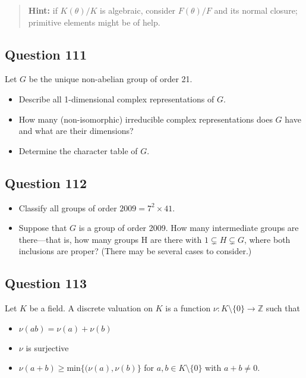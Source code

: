 \documentclass[12pt]{article}
\begin{document}
\begin{quote}
\textbf{Hint:} if \(K(\theta)/K\) is algebraic, consider \(F(\theta)/F\)
and its normal closure; primitive elements might be of help.
\end{quote}

\hypertarget{question-111}{%
\subsection{Question 111}\label{question-111}}

Let \(G\) be the unique non-abelian group of order 21.

\begin{itemize}
\item
  Describe all 1-dimensional complex representations of \(G\).
\item
  How many (non-isomorphic) irreducible complex representations does
  \(G\) have and what are their dimensions?
\item
  Determine the character table of \(G\).
\end{itemize}

\hypertarget{question-112}{%
\subsection{Question 112}\label{question-112}}

\begin{itemize}
\item
  Classify all groups of order \(2009=7^2\times 41\).
\item
  Suppose that \(G\) is a group of order 2009. How many intermediate
  groups are there---that is, how many groups H are there with
  \(1\subsetneq H\subsetneq G\), where both inclusions are proper?
  (There may be several cases to consider.)
\end{itemize}

\hypertarget{question-113}{%
\subsection{Question 113}\label{question-113}}

Let \(K\) be a field. A discrete valuation on \(K\) is a function
\(\nu: K\setminus\{0\}\rightarrow\mathbb Z\) such that

\begin{itemize}
\item
  \(\nu(ab)=\nu(a)+\nu(b)\)
\item
  \(\nu\) is surjective
\item
  \(\nu(a+b)\geq\text{min}\{(\nu(a),\nu(b)\}\) for
  \(a,b\in K\setminus\{0\}\) with \(a+b\neq 0\).
\end{itemize}
\end{document}

